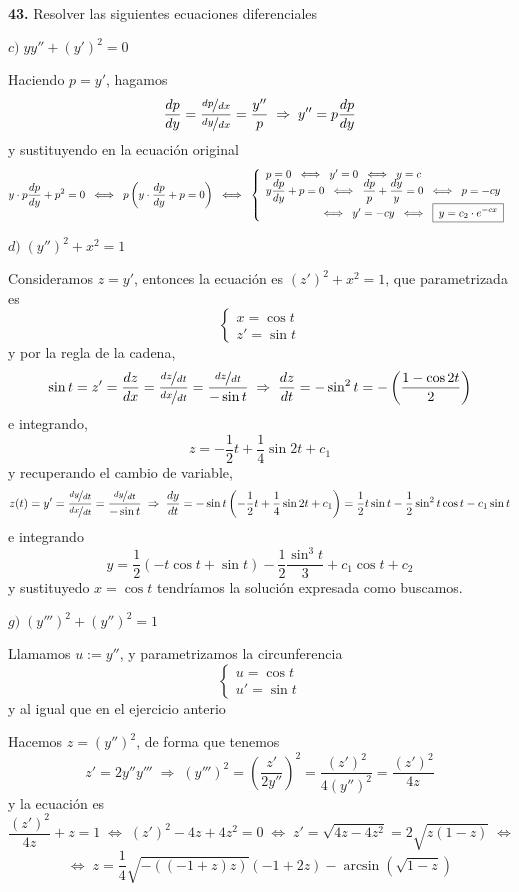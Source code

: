 \begin{ejer}
    \textbf{43.} Resolver las siguientes ecuaciones diferenciales

    $c) \; yy''+(y')^2 = 0$
        \begin{sol}
    Haciendo $p=y'$, hagamos 
    $$\dfrac{dp}{dy}=\dfrac{\nicefrac{dp}{dx}}{\nicefrac{dy}{dx}}=\dfrac{y''}{p} \; \Rightarrow \; y''=p \dfrac{dp}{dy}$$
y sustituyendo en la ecuación original
$$y \cdot p \dfrac{dp}{dy}+p^2=0  \; \iff \; p\left( y \cdot \dfrac{dp}{dy}+p=0\right) \; \iff \; \left\{ \begin{array}{l}
     p = 0 \; \iff \; y'=0 \; \iff \; y=c  \\
     \vspace{-5mm} \\
     y \dfrac{dp}{dy}+p=0 \; \iff \; \dfrac{dp}{p}+\dfrac{dy}{y}=0 \; \iff \; p=-cy  \\
     \qquad \qquad \quad \iff \; y'=-cy \; \iff \; \boxed{ \: y=c_2\cdot e^{-cx} \: }
\end{array}\right.$$
\end{sol}

    $d) \; (y'')^2 + x^2 = 1$
\begin{sol}
    Consideramos $z=y'$, entonces la ecuación es $(z')^2+x^2=1$, que parametrizada es
    $$\left\{ \begin{array}{l}
         x=\cos t  \\
         z'=\sin t  
    \end{array} \right.$$
    y por la regla de la cadena, 
    $$\sin t =z'=\dfrac{dz}{dx}=\dfrac{\nicefrac{dz}{dt}}{\nicefrac{dx}{dt}}=\dfrac{\nicefrac{dz}{dt}}{-\sin t} \; \Rightarrow \; \dfrac{dz}{dt}=-\sin^2 t = -\left( \dfrac{1-\cos 2t}{2}\right)$$
    e integrando, 
    $$z=-\dfrac{1}{2}t+\dfrac{1}{4} \sin 2t + c_1$$
    y recuperando el cambio de variable,
    $$z(t)=y'=\dfrac{\nicefrac{dy}{dt}}{\nicefrac{dx}{dt}}=\dfrac{\nicefrac{dy}{dt}}{-\sin t} \;\Rightarrow \; \dfrac{dy}{dt}=-\sin t\left( -\dfrac{1}{2}t+\dfrac{1}{4}\sin 2t+c_1\right)=\dfrac{1}{2}t \sin t - \dfrac{1}{2} \sin^2 t \cos t - c_1\sin t$$
    e integrando
    $$y=\dfrac{1}{2}(-t \cos t+\sin t )- \dfrac{1}{2}\dfrac{\sin^3 t}{3}+c_1\cos t +c_2$$
    y sustituyedo $x=\cos t$ tendríamos la solución expresada como buscamos.
\end{sol}
    $g) \; (y''')^2+(y'')^2=1$
\begin{sol}
Llamamos $u:=y''$, y parametrizamos la circunferencia
    $$\left\{ \begin{array}{l}
         u=\cos t  \\
         u'=\sin t  
    \end{array} \right.$$
    y al igual que en el ejercicio anterio


    Hacemos $z=(y'')^2$, de forma que tenemos 
    $$z'=2y''y''' \; \Rightarrow \; (y''')^2=\left(\dfrac{z'}{2y''}\right)^2=\dfrac{(z')^2}{4(y'')^2}=\dfrac{(z')^2}{4z}$$
    y la ecuación es 
    $$\dfrac{(z')^2}{4z}+z=1 \; \iff \; (z')^2-4z+4z^2=0 \; \iff \; z'=\sqrt{4z-4z^2}=2\sqrt{z(1-z)} \; \iff$$
    $$\iff \; z=\dfrac{1}{4} \sqrt{-((-1 + z) z)} (-1 + 2 z) - \arcsin(\sqrt{1 - z})$$
\end{sol}
\end{ejer}
